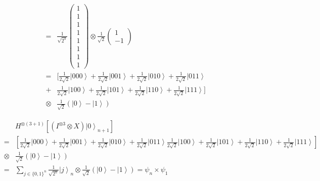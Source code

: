 \begin{frame}
	\begin{exampleblock}{}
		\begin{eqnarray}
			&=&\frac{1}{\sqrt{2^{3}}}\left(\begin{array}{c}
			1\\
			1\\
			1\\
			1\\
			1\\
			1\\
			1\\
			1
			\end{array}\right)\otimes\frac{1}{\sqrt{2}}\left(\begin{array}{c}
			1\\
			-1
			\end{array}\right)\\
			&=&[ \frac{1}{2\sqrt{2}}\left.|000\right\rangle +\frac{1}{2\sqrt{2}}\left.|001\right\rangle +\frac{1}{2\sqrt{2}}\left.|010\right\rangle +\frac{1}{2\sqrt{2}}\left.|011\right\rangle \\&+&\frac{1}{2\sqrt{2}}\left.|100\right\rangle +\frac{1}{2\sqrt{2}}\left.|101\right\rangle +\frac{1}{2\sqrt{2}}\left.|110\right\rangle +\frac{1}{2\sqrt{2}}\left.|111\right\rangle] \\&\otimes&\frac{1}{\sqrt{2}}\left(\left.|0\right\rangle -\left.|1\right\rangle \right)			
		\end{eqnarray}
	\end{exampleblock}
\end{frame}

\begin{frame}{}
	\begin{exampleblock}{}
		\begin{eqnarray}
			&&H^{\otimes\left(3+1\right)}\left[(I^{\otimes3}\otimes X)\left.|0\right\rangle _{n+1}\right]\\&=&\left[\frac{1}{2\sqrt{2}}\left.|000\right\rangle +\frac{1}{2\sqrt{2}}\left.|001\right\rangle +\frac{1}{2\sqrt{2}}\left.|010\right\rangle +\frac{1}{2\sqrt{2}}\left.|011\right\rangle \frac{1}{2\sqrt{2}}\left.|100\right\rangle +\frac{1}{2\sqrt{2}}\left.|101\right\rangle +\frac{1}{2\sqrt{2}}\left.|110\right\rangle +\frac{1}{2\sqrt{2}}\left.|111\right\rangle \right]\\&\otimes&\frac{1}{\sqrt{2}}\left(\left.|0\right\rangle -\left.|1\right\rangle \right)\\&=&\sum_{j\in\{0,1\}^{n}}\frac{1}{\sqrt{2^{n}}}\left.|j\right\rangle _{n}\otimes\frac{1}{\sqrt{2}}\left(\left.|0\right\rangle -\left.|1\right\rangle \right)=\psi_{n}\times\psi_{1}
		\end{eqnarray}
	\end{exampleblock}
\end{frame}
